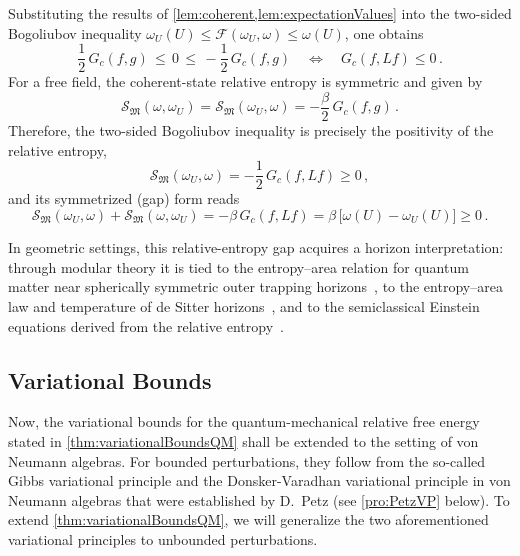 \documentclass[a4paper, twoside, 11pt, reqno]{amsart}
\theoremstyle{definition}
\theoremstyle{plain}
\newcommand{\MF}{\mathcal{F}}
\newcommand{\MS}{\mathcal{S}}
\newcommand{\MFM}{\mathfrak{M}}
\newcommand{\1}{\mathbf{1}}
\newcommand{\Gc}{G_{c}}
\begin{document}
Substituting the results of \cref{lem:coherent,lem:expectationValues} into the two-sided Bogoliubov inequality $\omega_U(U) \le \MF (\omega_U, \omega) \le \omega(U)$, one obtains
\begin{equation*}
    \frac{1}{2} \, \Gc(f,g) \, \le \, 0 \, \le \, - \frac{1}{2} \, \Gc(f,g) \quad \Leftrightarrow \quad \Gc(f,Lf) \le 0 \, .
\end{equation*}
For a free field, the coherent-state relative entropy is symmetric and given by~\cite{Casini2019, Longo2019}
\begin{equation*}
    \MS_\MFM (\omega, \omega_U) = \MS_\MFM (\omega_U, \omega) = - \frac{\beta}{2} \, \Gc(f,g) \, .
\end{equation*}
Therefore, the two-sided Bogoliubov inequality is precisely the positivity of the relative entropy,
\begin{equation*}
    \MS_\MFM (\omega_U, \omega) = - \frac{1}{2} \, \Gc(f,Lf) \ge 0 \, ,
\end{equation*}
and its symmetrized (gap) form reads
\begin{equation*}
    \MS_\MFM (\omega_U, \omega) + \MS_\MFM (\omega, \omega_U) = - \beta \, \Gc(f,Lf) = \beta \, \big[\omega(U)-\omega_U(U)\big] \ge 0 \, .
\end{equation*}

In geometric settings, this relative-entropy gap acquires a horizon interpretation: through modular theory it is tied to the entropy--area
relation for quantum matter near spherically symmetric outer trapping horizons~\cite{Kurpicz2021}, to the entropy--area law and temperature of de Sitter horizons~\cite{DAngelo2024}, and to the semiclassical Einstein equations derived from the relative entropy~\cite{Dorau2026}.


\subsection{Variational Bounds}\label{subsec:variationalBounds}

Now, the variational bounds for the quantum-mechanical relative free energy stated in \cref{thm:variationalBoundsQM} shall be extended to the setting of von Neumann algebras. For bounded perturbations, they follow from the so-called Gibbs variational principle and the Donsker-Varadhan variational principle in von Neumann algebras that were established by D.~Petz \cite{Petz1988} (see \cref{pro:PetzVP} below). To extend \cref{thm:variationalBoundsQM}, we will generalize the two aforementioned variational principles to unbounded perturbations.
\end{document}

